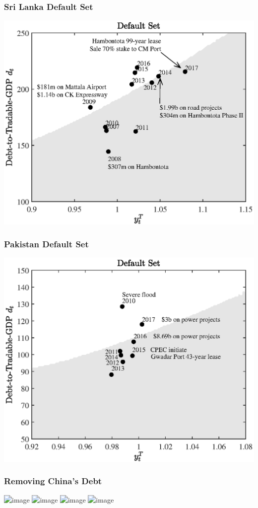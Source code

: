 \documentclass[mathserif]{beamer}
\begin{document}
    \begin{frame}[label = {sri_ds}]
        \frametitle{Sri Lanka Default Set}
        \centering
        \includegraphics[width = 0.8 \textwidth]{fig/default_set_sri_trad_hp_with_china.eps}\\
    \end{frame}

    \begin{frame}[label = {pak_ds}]
        \frametitle{Pakistan Default Set}
        \centering
        \includegraphics[width = 0.8 \textwidth]{fig/default_set_pak_trad_hp_with_china.eps}\\
    \end{frame}

    \begin{frame}
        \frametitle{Removing China's Debt}
        \centering
        \includegraphics<1>[width = 0.8 \textwidth]{fig/sri_with_china.png}%
        \includegraphics<2>[width = 0.8 \textwidth]{fig/sri_x_china.png}%
        \includegraphics<3>[width = 0.8 \textwidth]{fig/pak_with_china.png}%
        \includegraphics<4>[width = 0.8 \textwidth]{fig/pak_x_china.png}%
    \end{frame}
\end{document}
